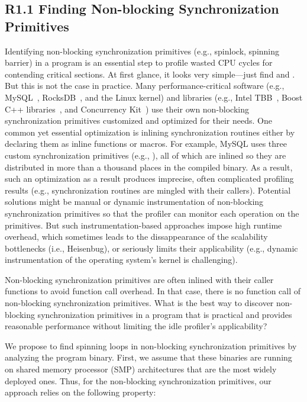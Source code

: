 \subsection{R1.1 Finding Non-blocking Synchronization Primitives}
\label{sub:spinfinder}

Identifying non-blocking synchronization primitives (e.g., spinlock,
spinning barrier) in a program is an essential step to profile wasted
CPU cycles for contending critical sections. At first glance, it looks
very simple---just find  and
.
%
But this is not the case in practice. Many performance-critical software
(e.g., MySQL~\cite{mysql:web}, RocksDB~\cite{rocksdb:web}, and the Linux kernel) 
and libraries (e.g., Intel TBB~\cite{tbb:web}, Boost C++
libraries~\cite{boost:web}, and Concurrency Kit~\cite{ck:web}) 
use their own non-blocking synchronization primitives
customized and optimized for their needs.
One common yet essential optimization
is inlining synchronization routines
either by declaring them as inline functions or macros. 
For example, MySQL uses three custom synchronization primitives (e.g.,
), all of which
are inlined so they are distributed in more than a thousand places
in the compiled binary.
%
As a result, such an optimization as a result produces imprecise,
often complicated profiling results
(e.g., synchronization routines are mingled with their callers).
%
Potential solutions might be manual or dynamic instrumentation of
non-blocking synchronization primitives so that the profiler can monitor
each operation on the primitives. But such instrumentation-based
approaches impose high runtime overhead, which sometimes leads to
the dissappearance of the scalability bottlenecks (i.e., Heisenbug), or
seriously limits their applicability (e.g., dynamic instrumentation of
the operating system's kernel is challenging).

\boxbeg
\begin{Challenge}
  Non-blocking synchronization primitives are often inlined with their
  caller functions to avoid function call overhead. In that case,
  there is no function call of non-blocking synchronization
  primitives. What is the best way to discover non-blocking
  synchronization primitives in a program that is practical and
  provides reasonable performance without limiting the idle profiler's
  applicability?
\end{Challenge}
\boxend

We propose to find spinning loops in non-blocking synchronization
primitives by analyzing the program binary.
First, we assume that these binaries are running on shared memory
processor (SMP) architectures that are the most widely deployed ones.
Thus, for the non-blocking synchronization primitives, our approach
relies on the following property:

